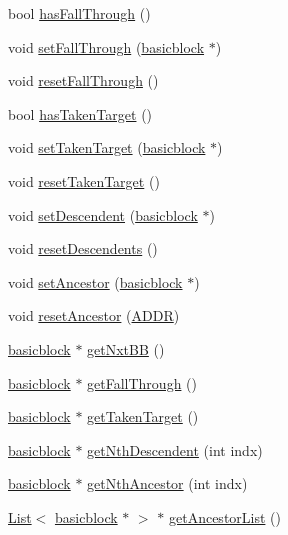 \begin{DoxyCompactItemize}
\item 
bool \hyperlink{classbasicblock_ac6c9417ec2fdc2795a8d2ece003bd253}{hasFallThrough} ()
\item 
void \hyperlink{classbasicblock_acf97e4fe55cfcd74ac0b0d6532e2e291}{setFallThrough} (\hyperlink{classbasicblock}{basicblock} $\ast$)
\item 
void \hyperlink{classbasicblock_a595a0a54024fca0c88de5b56388e06de}{resetFallThrough} ()
\item 
bool \hyperlink{classbasicblock_a935cd5566e8d7bed3764b7920f7ee200}{hasTakenTarget} ()
\item 
void \hyperlink{classbasicblock_a0fba29b7f9e057f174698cfb0564873e}{setTakenTarget} (\hyperlink{classbasicblock}{basicblock} $\ast$)
\item 
void \hyperlink{classbasicblock_a1194e61470d8e910c31dd03df0328da7}{resetTakenTarget} ()
\item 
void \hyperlink{classbasicblock_af05cd0f5ccbb4d0484b07d74e369de0d}{setDescendent} (\hyperlink{classbasicblock}{basicblock} $\ast$)
\item 
void \hyperlink{classbasicblock_a30cba20ee229efa0e17706a78a42fa13}{resetDescendents} ()
\item 
void \hyperlink{classbasicblock_abd5ac29c38d0f84eb5dccc87a269cc28}{setAncestor} (\hyperlink{classbasicblock}{basicblock} $\ast$)
\item 
void \hyperlink{classbasicblock_aae9d33169e6428c1cf8fa63f02fdff0c}{resetAncestor} (\hyperlink{binaryTranslator_2global_8h_a8bb6b77b3aab51e3a8d1866dd5861225}{ADDR})
\item 
\hyperlink{classbasicblock}{basicblock} $\ast$ \hyperlink{classbasicblock_aae1b2e9429abfe8474fb5f1bc5a204b2}{getNxtBB} ()
\item 
\hyperlink{classbasicblock}{basicblock} $\ast$ \hyperlink{classbasicblock_a8024f7c124db80125950b2582ee28e81}{getFallThrough} ()
\item 
\hyperlink{classbasicblock}{basicblock} $\ast$ \hyperlink{classbasicblock_a4be1cedc2d2596df89d3b9f118c0e445}{getTakenTarget} ()
\item 
\hyperlink{classbasicblock}{basicblock} $\ast$ \hyperlink{classbasicblock_a571a65129ed999a167803d516cb9455e}{getNthDescendent} (int indx)
\item 
\hyperlink{classbasicblock}{basicblock} $\ast$ \hyperlink{classbasicblock_a24ef17acb451da40eb9ecca3a05c9fb3}{getNthAncestor} (int indx)
\item 
\hyperlink{classList}{List}$<$ \hyperlink{classbasicblock}{basicblock} $\ast$ $>$ $\ast$ \hyperlink{classbasicblock_a006ea6066123e6c2a0ba76784dfcee1c}{getAncestorList} ()

\end{DoxyCompactItemize}
